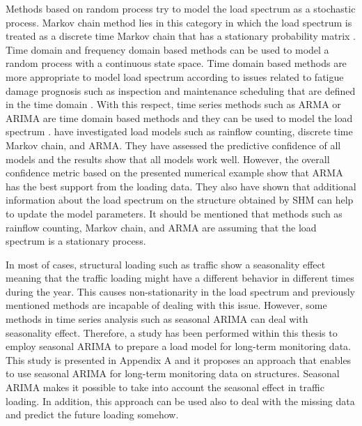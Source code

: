 Methods based on random process try to model the load spectrum as a stochastic process. Markov chain method lies in this category in which the load spectrum is treated as a discrete time Markov chain 
that has a stationary probability matrix \citep{KRENK1989247}. Time domain and frequency domain based methods can be used to model a random process with a continuous state space. Time domain based 
methods are more appropriate to model load spectrum according to issues related to fatigue damage prognosis such as inspection and maintenance scheduling that are defined in the time domain \citep{LING2011868}. 
With this respect, time series methods such as ARMA or ARIMA are time domain based methods and they can be used to model the load spectrum \citep{BENASCIUTTI2007232}. \citet{LING2011868} have
investigated load models such as rainflow counting, discrete time Markov chain, and ARMA. They have assessed the predictive confidence of all models and the results show that all models work well. 
However, the overall confidence metric based on the presented numerical example show that ARMA has the best support from the loading data. They also have shown that additional information about the 
load spectrum on the structure obtained by SHM can help to update the model parameters. It should be mentioned that methods such as rainflow counting, Markov chain, and ARMA are assuming that the 
load spectrum is a stationary process. 

In most of cases, structural loading such as traffic show a seasonality effect meaning that the traffic loading might have a different behavior in different times during the year. This causes 
non-stationarity in the load spectrum and previously mentioned methods are incapable of dealing with this issue. However, some methods in time series analysis such as seasonal ARIMA can deal with 
seasonality effect. Therefore, a study has been performed within this thesis to employ seasonal ARIMA to prepare
a load model for long-term monitoring data. This study is presented in Appendix A and it proposes an approach that enables to use seasonal ARIMA for long-term monitoring data on structures. Seasonal
ARIMA makes it possible to take into account the seasonal effect in traffic loading. In addition, this approach can be used also to deal with the missing data and predict the future loading somehow.

